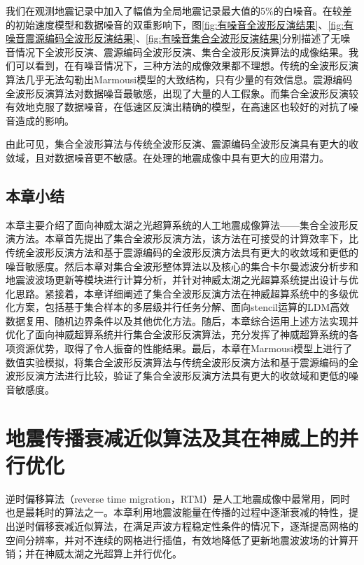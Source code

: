 \documentclass[degree=doctor]{thuthesis}
\begin{document}
我们在观测地震记录中加入了幅值为全局地震记录最大值的5\%的白噪音。在较差的初始速度模型和数据噪音的双重影响下，图\ref{fig:有噪音全波形反演结果}、\ref{fig:有噪音震源编码全波形反演结果}、\ref{fig:有噪音集合全波形反演结果}分别描述了无噪音情况下全波形反演、震源编码全波形反演、集合全波形反演算法的成像结果。我们可以看到，在有噪音情况下，三种方法的成像效果都不理想。传统的全波形反演算法几乎无法勾勒出Marmousi模型的大致结构，只有少量的有效信息。震源编码全波形反演算法对数据噪音最敏感，出现了大量的人工假象。而集合全波形反演较有效地克服了数据噪音，在低速区反演出精确的模型，在高速区也较好的对抗了噪音造成的影响。

由此可见，集合全波形算法与传统全波形反演、震源编码全波形反演具有更大的收敛域，且对数据噪音更不敏感。在处理的地震成像中具有更大的应用潜力。


\section{本章小结} %
\label{sec:本章小结}

本章主要介绍了面向神威太湖之光超算系统的人工地震成像算法——集合全波形反演方法。本章首先提出了集合全波形反演方法，该方法在可接受的计算效率下，比传统全波形反演方法和基于震源编码的全波形反演方法具有更大的收敛域和更低的噪音敏感度。然后本章对集合全波形整体算法以及核心的集合卡尔曼滤波分析步和地震波波场更新等模块进行计算分析，并针对神威太湖之光超算系统提出设计与优化思路。紧接着，本章详细阐述了集合全波形反演方法在神威超算系统中的多级优化方案，包括基于集合样本的多层级并行任务分解、面向stencil运算的LDM高效数据复用、随机边界条件以及其他优化方法。随后，本章综合运用上述方法实现并优化了面向神威超算系统并行集合全波形反演算法，充分发挥了神威超算系统的各项资源优势，取得了令人振奋的性能结果。最后，本章在Marmousi模型上进行了数值实验模拟，将集合全波形反演算法与传统全波形反演方法和基于震源编码的全波形反演方法进行比较，验证了集合全波形反演方法具有更大的收敛域和更低的噪音敏感度。


\chapter{地震传播衰减近似算法及其在神威上的并行优化}

逆时偏移算法（reverse time migration，RTM）是人工地震成像中最常用，同时也是最耗时的算法之一。本章利用地震波能量在传播的过程中逐渐衰减的特性，提出逆时偏移衰减近似算法，在满足声波方程稳定性条件的情况下，逐渐提高网格的空间分辨率，并对不连续的网格进行插值，有效地降低了更新地震波波场的计算开销；并在神威太湖之光超算上并行优化。
\end{document}
